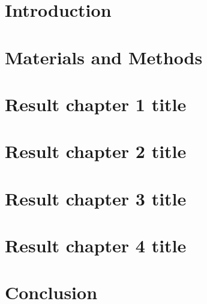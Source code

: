 \documentclass[12pt, twoside, titlepage]{report}
\begin{document}
	\chapter{Introduction}
	\newpage
	

	\chapter{Materials and Methods}
	\newpage
	
	
	\chapter{Result chapter 1 title}
	\newpage
	
	
	
	\chapter{Result chapter 2 title}
	\newpage
	
	
	\chapter{Result chapter 3 title}
	\newpage
	
	
	\chapter{Result chapter 4 title}
	\newpage
	
	
	
	\chapter{Conclusion}
	\newpage
	
	
	
	\appendix
	\chapter{}
	\newpage
	


	\printbibliography
	
	
	
\end{document}
